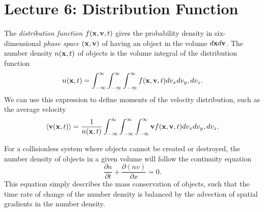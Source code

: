 \documentclass[]{article}
\begin{document}
\section{Lecture 6: Distribution Function}

The {\it distribution function} $f(\mathbf{x},\mathbf{v},t)$ gives the probability density
in six-dimensional {\it phase space} $(\mathbf{x},\mathbf{v})$ of having an object
in the volume $d\mathbf{x} d\mathbf{v}$.  The number density $n(\mathbf{x},t)$ of objects is the
volume integral of the distribution function
\begin{equation}
n(\mathbf{x},t) = \int_{-\infty}^{\infty}\int_{-\infty}^{\infty}\int_{-\infty}^{\infty} f(\mathbf{x},\mathbf{v},t) dv_{x}dv_y,dv_z.
\end{equation}
\noindent
We can use this expression to define moments of the velocity distribution, such as
the average velocity 
\begin{equation}
\langle\mathbf{v}(\mathbf{x},t)\rangle = \frac{1}{n(\mathbf{x},t)} \int_{-\infty}^{\infty}\int_{-\infty}^{\infty}\int_{-\infty}^{\infty} \mathbf{v} f(\mathbf{x},\mathbf{v},t) dv_{x}dv_y,dv_z.
\end{equation}

For a collisionless system where objects cannot be created or destroyed, the number density of objects
in a given volume will follow the continuity equation
\begin{equation}
\label{eqn:continuity}
\frac{\partial n}{\partial t} + \frac{\partial (nv)}{\partial x} = 0.
\end{equation}
\noindent
This equation simply describes the mass conservation of objects, such that
the time rate of change of the number density is balanced by the advection of
spatial gradients in the number density.
\end{document}
